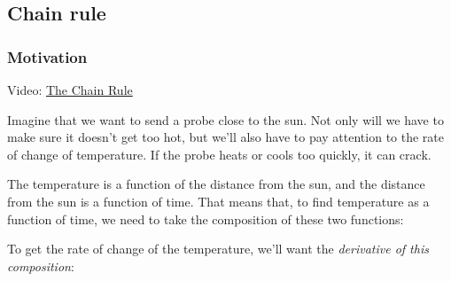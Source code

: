 \documentclass[pdftex, brazil, 12pt, twoside]{article}
\begin{document}
\subsection{Chain rule}
\label{u2-chain-rule}

\subsubsection{Motivation}
\label{u2-chain-rule-motivation}

Video: \href{https://www.youtube.com/watch?v=Xv1Uh4-ysc4}{The Chain Rule}

Imagine that we want to send a probe close to the sun.
Not only will we have to make sure it doesn't get too hot,
but we'll also have to pay attention
to the rate of change of temperature.
If the probe heats or cools too quickly, it can crack.

The temperature is a function of the distance from the sun,
and the distance from the sun is a function of time.
That means that, to find temperature
as a function of time, we need to take the composition
of these two functions:

\begin{figure}[H]
  \begin{center}
  \end{center}
\end{figure}

To get the rate of change of the temperature,
we'll want the \emph{derivative of this composition}:
\end{document}
